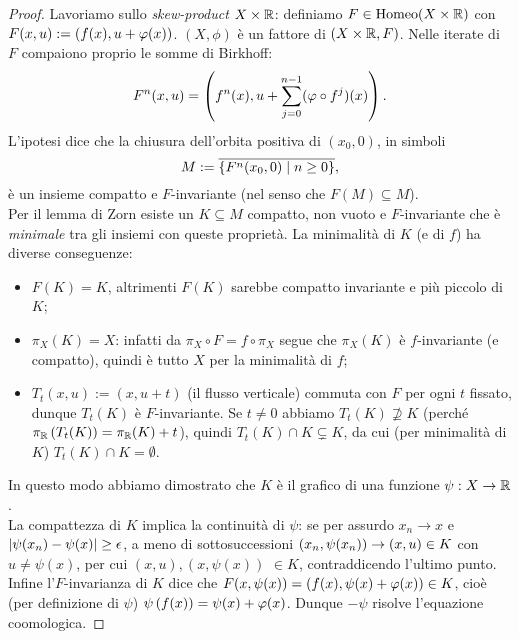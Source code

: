 \begin{proof} Lavoriamo sullo \emph{skew-product} $X\times\mathbb{R}$: definiamo $F\in\operatorname{Homeo}(X\times\mathbb{R})$
con $F(x,u):=\left(f(x),u+\varphi(x)\right)$. $(X,\phi)$ è un fattore di $(X\times\mathbb{R},F)$.
Nelle iterate di $F$ compaiono proprio le somme di Birkhoff:
\[ F^n(x,u)=\left(f^n(x),u+\sum_{j=0}^{n-1}(\varphi\circ f^j)(x)\right). \]
L'ipotesi dice che la chiusura dell'orbita positiva di $(x_0,0)$, in simboli
\[ M:=\overline{\left\{F^n(x_0,0)\mid n\ge 0\right\}}, \]
è un insieme compatto e $F$-invariante (nel senso che $F(M)\subseteq M$). \\
Per il lemma di Zorn esiste un $K\subseteq M$ compatto, non vuoto e $F$-invariante che è \emph{minimale} tra gli insiemi
con queste proprietà. La minimalità di $K$ (e di $f$) ha diverse conseguenze:
\begin{itemize}
	\item $F(K)=K$, altrimenti $F(K)$ sarebbe compatto invariante e più piccolo di $K$;
	\item $\pi_X(K)=X$: infatti da $\pi_X\circ F=f\circ\pi_X$ segue che $\pi_X(K)$ è $f$-invariante (e compatto),
	quindi è tutto $X$ per la minimalità di $f$;
	\item $T_t(x,u):=(x,u+t)$ (il flusso verticale) commuta con $F$ per ogni $t$ fissato, dunque
	$T_t(K)$ è $F$-invariante. Se $t\neq 0$ abbiamo $T_t(K)\nsupseteq K$ (perché $\pi_{\mathbb{R}}\left(T_t(K)\right)=\pi_{\mathbb{R}}(K)+t$),
	quindi $T_t(K)\cap K\subsetneq K$, da cui (per minimalità di $K$) $T_t(K)\cap K=\emptyset$.
\end{itemize}
In questo modo abbiamo dimostrato che $K$ è il grafico di una funzione $\psi:X\to\mathbb{R}$. \\
La compattezza di $K$ implica la continuità di $\psi$: se per assurdo $x_n\to x$ e $\left|\psi(x_n)-\psi(x)\right|\ge\epsilon$,
a meno di sottosuccessioni $\left(x_n,\psi(x_n)\right)\to (x,u)\in K$ con $u\neq\psi(x)$, per cui
$(x,u),(x,\psi(x))$ $\in K$, contraddicendo l'ultimo punto. \\
Infine l'$F$-invarianza di $K$ dice che $F(x,\psi(x))=\left(f(x),\psi(x)+\varphi(x)\right)\in K$, cioè (per definizione di $\psi$)
$\psi\left(f(x)\right)=\psi(x)+\varphi(x)$. Dunque $-\psi$ risolve l'equazione coomologica.
\end{proof}

